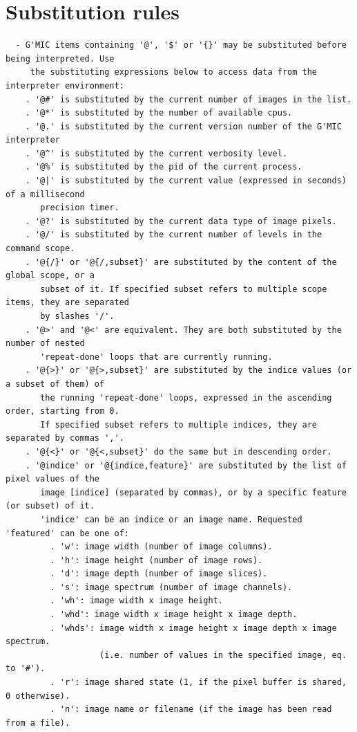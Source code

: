\documentclass[a4paper,11pt,twoside]{book}
\begin{document}
\section{Substitution rules}
\small
\begin{lstlisting}
  - G'MIC items containing '@', '$' or '{}' may be substituted before being interpreted. Use 
     the substituting expressions below to access data from the interpreter environment: 
    . '@#' is substituted by the current number of images in the list. 
    . '@*' is substituted by the number of available cpus. 
    . '@.' is substituted by the current version number of the G'MIC interpreter 
    . '@^' is substituted by the current verbosity level. 
    . '@%' is substituted by the pid of the current process. 
    . '@|' is substituted by the current value (expressed in seconds) of a millisecond 
       precision timer. 
    . '@?' is substituted by the current data type of image pixels. 
    . '@/' is substituted by the current number of levels in the command scope. 
    . '@{/}' or '@{/,subset}' are substituted by the content of the global scope, or a 
       subset of it. If specified subset refers to multiple scope items, they are separated 
       by slashes '/'. 
    . '@>' and '@<' are equivalent. They are both substituted by the number of nested 
       'repeat-done' loops that are currently running. 
    . '@{>}' or '@{>,subset}' are substituted by the indice values (or a subset of them) of 
       the running 'repeat-done' loops, expressed in the ascending order, starting from 0. 
       If specified subset refers to multiple indices, they are separated by commas ','. 
    . '@{<}' or '@{<,subset}' do the same but in descending order. 
    . '@indice' or '@{indice,feature}' are substituted by the list of pixel values of the 
       image [indice] (separated by commas), or by a specific feature (or subset) of it. 
       'indice' can be an indice or an image name. Requested 'featured' can be one of: 
         . 'w': image width (number of image columns). 
         . 'h': image height (number of image rows). 
         . 'd': image depth (number of image slices). 
         . 's': image spectrum (number of image channels). 
         . 'wh': image width x image height. 
         . 'whd': image width x image height x image depth. 
         . 'whds': image width x image height x image depth x image spectrum. 
                   (i.e. number of values in the specified image, eq. to '#'). 
         . 'r': image shared state (1, if the pixel buffer is shared, 0 otherwise). 
         . 'n': image name or filename (if the image has been read from a file). 

\end{lstlisting}
\end{document}

